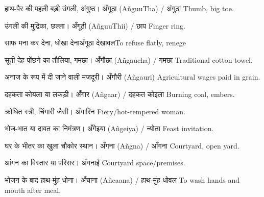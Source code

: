 %
{हाथ-पैर की पहली बड़ी उंगली, अंगुष्ठ।}%
{अँगूठा (AñguuTha) / अंगुठा}%
{Thumb, big toe.}

%
{उंगली की मुद्रिका, छल्ला।}%
{अँगूठी (AñguuThii) / छाप}%
{Finger ring.}

%
{साफ मना कर देना, धोखा देना}{अँगूठा देखावल}{To refuse flatly, renege}

%
{सूती देह पोंछने का तौलिया, गमछा।}%
{अँगौछा (Añgaucha) / गमछा}%
{Traditional cotton towel.}

%
{अनाज के रूप में दी जाने वाली मजदूरी।}%
{अँगौरी (Añgauri)}%
{Agricultural wages paid in grain.}

%
{दहकता कोयला या लकड़ी।}%
{अँगार (Añgaar) / दहकत कोइला}%
{Burning coal, embers.}

%
{क्रोधित स्त्री, चिंगारी जैसी।}%
{अँगारिन}%
{Fiery/hot-tempered woman.}

%
{भोज-भात या दावत का निमंत्रण।}%
{अँगेइया (Añgeiya) / न्योता}%
{Feast invitation.}

%
{घर के भीतर का खुला चौकोर स्थान।}%
{अँगना (Añgna) / आँगना}%
{Courtyard, open yard.}

%
{आंगन का विस्तार या परिसर।}%
{अँगनाई}%
{Courtyard space/premises.}

%
{भोजन के बाद हाथ-मुंह धोना।}%
{अँचाना (Añcaana) / हाथ-मुंह धोवल}%
{To wash hands and mouth after meal.}

